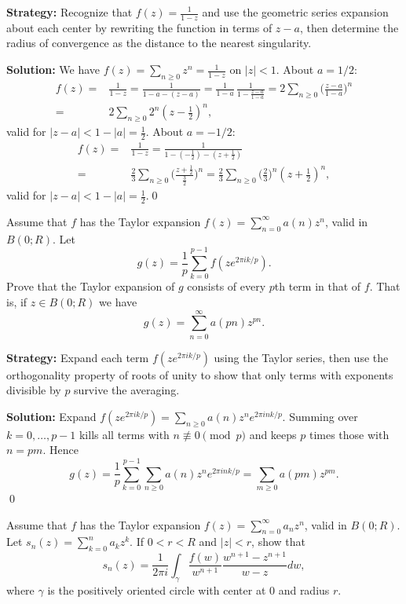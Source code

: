 \noindent\textbf{Strategy:} Recognize that \( f(z) = \frac{1}{1-z} \) and use the geometric series expansion about each center by rewriting the function in terms of \( z-a \), then determine the radius of convergence as the distance to the nearest singularity.

\bigskip\noindent\textbf{Solution:}
We have $f(z)=\sum_{n\ge0}z^n=\frac{1}{1-z}$ on $|z|<1$. About $a=1/2$:
\begin{align*}
f(z)=&\frac{1}{1-z}=\frac{1}{1-a-(z-a)}=\frac{1}{1-a}\,\frac{1}{1-\frac{z-a}{1-a}}=2\sum_{n\ge0}\Big(\frac{z-a}{1-a}\Big)^n \\
=&2\sum_{n\ge0}2^n(z-\tfrac12)^n,
\end{align*}
valid for $|z-a|<1-|a|=\tfrac12$. About $a=-1/2$:
\begin{align*}
f(z)=&\frac{1}{1-z}=\frac{1}{1-(-\tfrac12)-(z+\tfrac12)}\\
=&\frac{2}{3}\sum_{n\ge0}\Big(\frac{z+\tfrac12}{\tfrac32}\Big)^n=\frac{2}{3}\sum_{n\ge0}\Big(\frac{2}{3}\Big)^n(z+\tfrac12)^n,
\end{align*}
valid for $|z-a|<1-|a|=\tfrac12$.\qed


\begin{problembox}
\begin{problemstatement}
Assume that \( f \) has the Taylor expansion \( f(z) = \sum_{n=0}^{\infty} a(n)z^n \), valid in \( B(0; R) \). Let
\[g(z) = \frac{1}{p} \sum_{k=0}^{p-1} f(ze^{2\pi ik/p}).\]
Prove that the Taylor expansion of \( g \) consists of every \( p \)th term in that of \( f \). That is, if \( z \in B(0; R) \) we have
\[g(z) = \sum_{n=0}^{\infty} a(pn)z^{pn}.\]
\end{problemstatement}
\end{problembox}

\noindent\textbf{Strategy:} Expand each term \( f(ze^{2\pi ik/p}) \) using the Taylor series, then use the orthogonality property of roots of unity to show that only terms with exponents divisible by \( p \) survive the averaging.

\bigskip\noindent\textbf{Solution:}
Expand $f(ze^{2\pi ik/p})=\sum_{n\ge0} a(n) z^n e^{2\pi i n k/p}$. Summing over $k=0,\dots,p-1$ kills all terms with $n\not\equiv0\pmod p$ and keeps $p$ times those with $n=pm$. Hence
\[g(z)=\frac1p\sum_{k=0}^{p-1}\sum_{n\ge0} a(n)z^n e^{2\pi i nk/p}=\sum_{m\ge0}a(pm) z^{pm}.\]\qed


\begin{problembox}
\begin{problemstatement}
Assume that \( f \) has the Taylor expansion \( f(z) = \sum_{n=0}^{\infty} a_n z^n \), valid in \( B(0; R) \). Let \( s_n(z) = \sum_{k=0}^{n} a_k z^k \). If \( 0 < r < R \) and \( |z| < r \), show that
\[ s_n(z) = \frac{1}{2\pi i} \int_\gamma \frac{f(w)}{w^{n+1}} \frac{w^{n+1} -z^{n+1}}{w - z} dw, \]
where \( \gamma \) is the positively oriented circle with center at 0 and radius \( r \).
\end{problemstatement}
\end{problembox}

